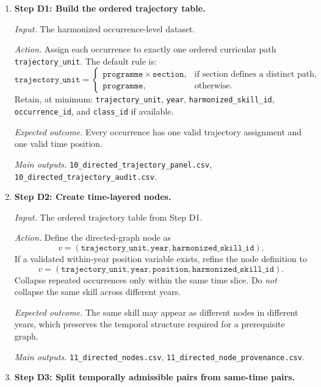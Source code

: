\begin{enumerate}

    \item \textbf{Step D1: Build the ordered trajectory table.}

    \textit{Input.} The harmonized occurrence-level dataset.

    \textit{Action.} Assign each occurrence to exactly one ordered curricular path
    \texttt{trajectory\_unit}. The default rule is:
    \[
    \texttt{trajectory\_unit}
    =
    \begin{cases}
    \texttt{programme} \times \texttt{section}, & \text{if section defines a distinct path},\\
    \texttt{programme}, & \text{otherwise.}
    \end{cases}
    \]
    Retain, at minimum:
    \texttt{trajectory\_unit}, \texttt{year}, \texttt{harmonized\_skill\_id},
    \texttt{occurrence\_id}, and \texttt{class\_id} if available.

    \textit{Expected outcome.} Every occurrence has one valid trajectory assignment and one valid
    time position.

    \textit{Main outputs.}
    \texttt{10\_directed\_trajectory\_panel.csv},
    \texttt{10\_directed\_trajectory\_audit.csv}.

    \item \textbf{Step D2: Create time-layered nodes.}

    \textit{Input.} The ordered trajectory table from Step D1.

    \textit{Action.} Define the directed-graph node as
    \[
    v = (\texttt{trajectory\_unit}, \texttt{year}, \texttt{harmonized\_skill\_id}).
    \]
    If a validated within-year position variable exists, refine the node definition to
    \[
    v = (\texttt{trajectory\_unit}, \texttt{year}, \texttt{position},
    \texttt{harmonized\_skill\_id}).
    \]
    Collapse repeated occurrences only within the same time slice. Do \emph{not} collapse the same
    skill across different years.

    \textit{Expected outcome.} The same skill may appear as different nodes in different years,
    which preserves the temporal structure required for a prerequisite graph.

    \textit{Main outputs.}
    \texttt{11\_directed\_nodes.csv},
    \texttt{11\_directed\_node\_provenance.csv}.

    \item \textbf{Step D3: Split temporally admissible pairs from same-time pairs.}


\end{enumerate}
